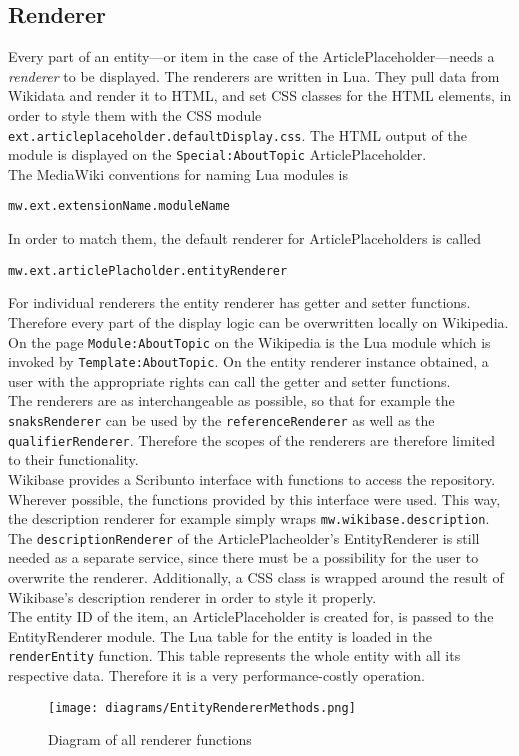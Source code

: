 \subsection{Renderer}

Every part of an entity---or item in the case of the ArticlePlaceholder---needs a \textit{renderer} to be displayed. The renderers are written in Lua. They pull data from Wikidata and render it to HTML, and set CSS classes for the HTML elements, in order to style them with the CSS module \texttt{\justify ext.articleplaceholder.defaultDisplay.css}. The HTML output of the module is displayed on the \texttt{\justify Special:AboutTopic} ArticlePlaceholder. \\
The MediaWiki conventions for naming Lua modules is 
\begin{center}
\texttt{\justify mw.ext.extensionName.moduleName} 
\end{center}
In order to match them, the default renderer for ArticlePlaceholders is called 
\begin{center}
\texttt{\justify mw.ext.articlePlacholder.entityRenderer}
\end{center}
For individual renderers the entity renderer has getter and setter functions. Therefore every part of the display logic can be overwritten locally on Wikipedia. \\
On the page \texttt{\justify Module:AboutTopic} on the Wikipedia is the Lua module which is invoked by \texttt{\justify Template:AboutTopic}. On the entity renderer instance obtained, a user with the appropriate rights can call the getter and setter functions. \\
The renderers are as interchangeable as possible, so that for example the \texttt{\justify snaksRenderer} can be used by the \texttt{\justify referenceRenderer} as well as the \texttt{\justify qualifierRenderer}. Therefore the scopes of the renderers are therefore limited to their functionality. \\
Wikibase provides a Scribunto interface with functions to access the repository. Wherever possible, the functions provided by this interface were used. This way, the description renderer for example simply wraps \texttt{\justify mw.wikibase.description}. The \texttt{\justify descriptionRenderer} of the ArticlePlacheolder's EntityRenderer is still needed as a separate service, since there must be a possibility for the user to overwrite the renderer. Additionally, a CSS class is wrapped around the result of Wikibase's description renderer in order to style it properly. \\
The entity ID of the item, an ArticlePlaceholder is created for, is passed to the EntityRenderer module. The Lua table for the entity is loaded in the \texttt{\justify renderEntity} function. This table represents the whole entity with all its respective data. Therefore it is a very performance-costly operation. \\

\begin{figure}[H]
	\centering
	\texttt{[image: diagrams/EntityRendererMethods.png]}
	\caption{Diagram of all renderer functions}
	\label{fig:renderer}
\end{figure}